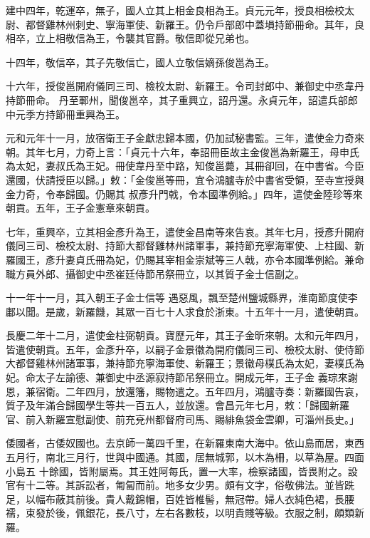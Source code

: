 \begin{pinyinscope}
 建中四年，乾運卒，無子，國人立其上相金良相為王。貞元元年，授良相檢校太尉、都督雞林州刺史、寧海軍使、新羅王。仍令戶部郎中蓋塤持節冊命。其年，良相卒，立上相敬信為王，令襲其官爵。敬信即從兄弟也。



 十四年，敬信卒，其子先敬信亡，國人立敬信嫡孫俊邕為王。



 十六年，授俊邕開府儀同三司、檢校太尉、新羅王。令司封郎中、兼御史中丞韋丹持節冊命。
 丹至鄆州，聞俊邕卒，其子重興立，詔丹還。永貞元年，詔遣兵部郎中元季方持節冊重興為王。



 元和元年十一月，放宿衛王子金獻忠歸本國，仍加試秘書監。三年，遣使金力奇來朝。其年七月，力奇上言：「貞元十六年，奉詔冊臣故主金俊邕為新羅王，母申氏為太妃，妻叔氏為王妃。冊使韋丹至中路，知俊邕薨，其冊卻回，在中書省。今臣還國，伏請授臣以歸。」敕：「金俊邕等冊，宜令鴻臚寺於中書省受領，至寺宣授與金力奇，令奉歸國。仍賜其
 叔彥升門戟，令本國準例給。」四年，遣使金陸珍等來朝貢。五年，王子金憲章來朝貢。



 七年，重興卒，立其相金彥升為王，遣使金昌南等來告哀。其年七月，授彥升開府儀同三司、檢校太尉、持節大都督雞林州諸軍事，兼持節充寧海軍使、上柱國、新羅國王，彥升妻貞氏冊為妃，仍賜其宰相金崇斌等三人戟，亦令本國準例給。兼命職方員外郎、攝御史中丞崔廷侍節吊祭冊立，以其質子金士信副之。



 十一年十一月，其入朝王子金士信等
 遇惡風，飄至楚州鹽城縣界，淮南節度使李鄘以聞。是歲，新羅饑，其眾一百七十人求食於浙東。十五年十一月，遣使朝貢。



 長慶二年十二月，遣使金柱弼朝貢。寶歷元年，其王子金昕來朝。太和元年四月，皆遣使朝貢。五年，金彥升卒，以嗣子金景徽為開府儀同三司、檢校太尉、使侍節大都督雞林州諸軍事，兼持節充寧海軍使、新羅王；景徽母樸氏為太妃，妻樸氏為妃。命太子左諭德、兼御史中丞源寂持節吊祭冊立。開成元年，王子金
 義琮來謝恩，兼宿衛。二年四月，放還籓，賜物遣之。五年四月，鴻臚寺奏：新羅國告哀，質子及年滿合歸國學生等共一百五人，並放還。會昌元年七月，敕：「歸國新羅官、前入新羅宣慰副使、前充兗州都督府司馬、賜緋魚袋金雲卿，可淄州長史。」



 倭國者，古倭奴國也。去京師一萬四千里，在新羅東南大海中。依山島而居，東西五月行，南北三月行，世與中國通。其國，居無城郭，以木為柵，以草為屋。四面小島五
 十餘國，皆附屬焉。其王姓阿每氏，置一大率，檢察諸國，皆畏附之。設官有十二等。其訴訟者，匍匐而前。地多女少男。頗有文字，俗敬佛法。並皆跣足，以幅布蔽其前後。貴人戴錦帽，百姓皆椎髻，無冠帶。婦人衣純色裙，長腰襦，束發於後，佩銀花，長八寸，左右各數枝，以明貴賤等級。衣服之制，頗類新羅。




\end{pinyinscope}
